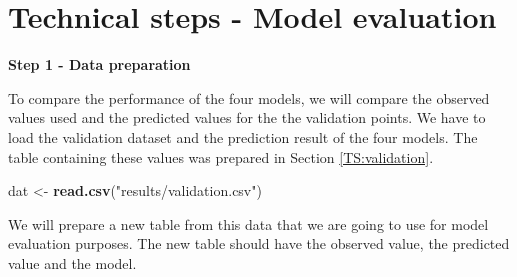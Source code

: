 \documentclass[10pt,b5paper,]{book}
\newenvironment{Shaded}{\begin{snugshade}}{\end{snugshade}}
\newcommand{\CommentTok}[1]{\textcolor[rgb]{0.56,0.35,0.01}{\textit{#1}}}
\newcommand{\DataTypeTok}[1]{\textcolor[rgb]{0.13,0.29,0.53}{#1}}
\newcommand{\KeywordTok}[1]{\textcolor[rgb]{0.13,0.29,0.53}{\textbf{#1}}}
\newcommand{\NormalTok}[1]{#1}
\newcommand{\OperatorTok}[1]{\textcolor[rgb]{0.81,0.36,0.00}{\textbf{#1}}}
\newcommand{\StringTok}[1]{\textcolor[rgb]{0.31,0.60,0.02}{#1}}
\theoremstyle{definition}
\theoremstyle{definition}
\theoremstyle{definition}
\theoremstyle{remark}
\begin{document}
\hypertarget{technical-steps---model-evaluation}{%
\section{Technical steps - Model
evaluation}\label{technical-steps---model-evaluation}}

\textbf{Step 1 - Data preparation}

To compare the performance of the four models, we will compare the
observed values used and the predicted values for the the validation
points. We have to load the validation dataset and the prediction result
of the four models. The table containing these values was prepared in
Section \ref{TS:validation}.

\begin{Shaded}
\begin{Highlighting}[]
\NormalTok{dat <-}\StringTok{ }\KeywordTok{read.csv}\NormalTok{(}\StringTok{"results/validation.csv"}\NormalTok{)}
\end{Highlighting}
\end{Shaded}

We will prepare a new table from this data that we are going to use for
model evaluation purposes. The new table should have the observed value,
the predicted value and the model.

\begin{Shaded}
\end{Shaded}
\end{document}
